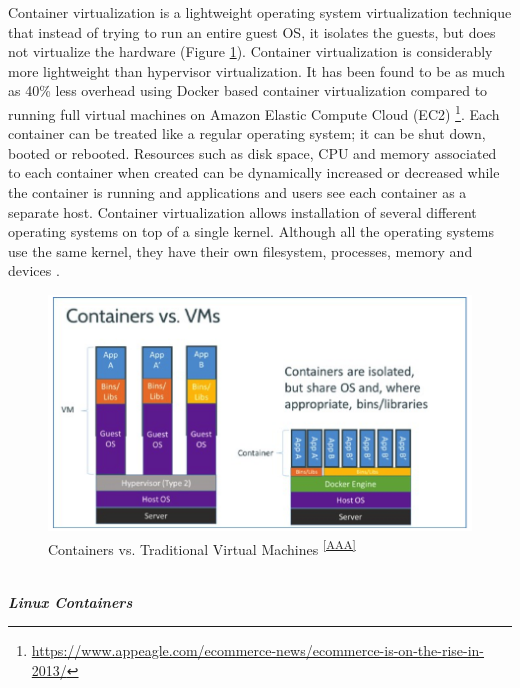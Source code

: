 \documentclass[a4paper,11pt,twoside]{article}
\begin{document}
\noindent
Container virtualization is a lightweight operating system virtualization technique that instead of trying to run an entire guest OS, it isolates the guests, but does not virtualize the hardware  \cite{container} (Figure \ref{vm vs container}). Container virtualization is considerably more lightweight than hypervisor virtualization. It has been found to be as much as 40\% less overhead using Docker based container virtualization compared to running full virtual machines on Amazon Elastic Compute Cloud (EC2) \footnote{\url{https://www.appeagle.com/ecommerce-news/ecommerce-is-on-the-rise-in-2013/}}. Each container can be treated like a regular operating system; it can be shut down, booted or rebooted. Resources such as disk space, CPU and memory associated to each container when created can be dynamically increased or decreased while the container is running and applications and users see each container as a separate host. Container virtualization allows installation of several different operating systems on top of a single kernel. Although all the operating systems use the same kernel, they have their own filesystem, processes, memory and devices \cite{container}. \bigskip


\begin{figure}[!ht]
  \centering
     \includegraphics[scale=1]{containervsvm}
  \caption{Containers vs. Traditional Virtual Machines \textsuperscript{\ref{AAA}}}%
  \label{vm vs container}  
\end{figure}
\vspace{-18pt}


\noindent
\\\textbf{\textit{Linux Containers}}
\end{document}
